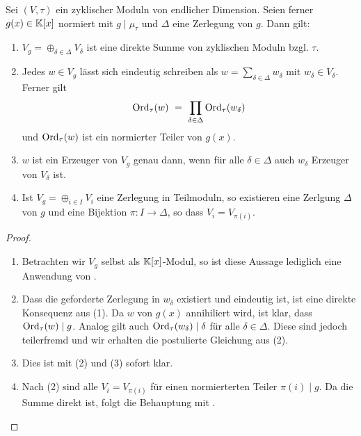 \begin{satz}
  \label{satz:zerlegungssatz_zykl_vektorraume}
  Sei $(V,\tau)$ ein zyklischer Moduln von endlicher Dimension. Seien ferner 
  $g(x) \in \mathbb{K}[x]$ normiert mit $g\mid \mu_\tau$ und $\Delta$ eine 
  Zerlegung von $g$. Dann gilt:
  \begin{enumerate}
    \item $V_g = \oplus_{\delta\in\Delta} V_\delta$ ist eine direkte Summe 
      von zyklischen Moduln bzgl. $\tau$.
    \item Jedes $w \in V_g$ lässt sich eindeutig schreiben als 
      $w = \sum_{\delta\in\Delta} w_\delta$ mit $w_\delta \in V_\delta$. Ferner
      gilt 
      \[ \operatorname{Ord}_\tau(w) \ =\  \prod_{\delta\in \Delta} \operatorname{Ord}_\tau(w_\delta)\]
      und $\operatorname{Ord}_\tau(w)$ ist ein normierter Teiler von $g(x)$.
    \item $w$ ist ein Erzeuger von $V_g$ genau dann, wenn für alle 
      $\delta\in\Delta$ auch $w_\delta$ Erzeuger von $V_\delta$ ist.
    \item Ist $V_g = \oplus_{i \in I} V_i$ eine Zerlegung in Teilmoduln,
      so existieren eine Zerlgung $\Delta$ von $g$ und 
      eine Bijektion $\pi:I\to\Delta$, so dass $V_i = V_{\pi(i)}$.
  \end{enumerate}
\end{satz}
\begin{proof}
  \begin{enumerate}
    \item Betrachten wir $V_g$ selbst als $\mathbb{K}[x]$-Modul, so ist diese Aussage
      lediglich eine Anwendung von .
    \item Dass die geforderte Zerlegung in $w_\delta$ existiert und eindeutig
      ist, ist eine direkte Konsequenz aus (1). Da $w$ von $g(x)$ annihiliert
      wird, ist klar, dass $\operatorname{Ord}_\tau(w) \mid g$. Analog gilt auch
      $\operatorname{Ord}_\tau(w_\delta)\mid \delta$ für alle $\delta \in \Delta$. Diese sind
      jedoch teilerfremd und wir erhalten die postulierte Gleichung aus
       (2).
    \item Dies ist mit (2) und  (3) sofort klar.
    \item Nach  (2) sind alle $V_i = V_{\pi(i)}$
      für einen normierterten Teiler $\pi(i) \mid g$. Da die Summe direkt ist,
      folgt die Behauptung mit .
  \end{enumerate}
\end{proof}
